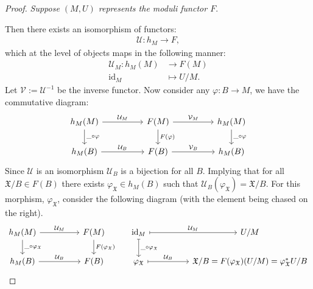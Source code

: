 \begin{proof}
    \textit{Suppose $(M,U)$ represents the moduli functor $F$}.
    \par Then there exists an isomorphism of functors:
    \begin{align*}
        \mathcal{U}:h_{M} \to F,
    \end{align*}
    which at the level of objects maps in the following manner:
    \begin{align*}
        \mathcal{U}_{M}:h_{M}(M) &\to F(M)\\
        \text{id}_{M} &\mapsto U/M.
    \end{align*}
    Let $\mathcal{V}:= \mathcal{U}^{-1}$ be the inverse functor. Now consider any $\varphi: B \to M$, we have the commutative diagram:
    \[
        \begin{tikzcd}
            h_{M}(M) & & F(M) & & h_{M}(M)\\
            h_{M}(B) & & F(B) & & h_{M}(B)
            \arrow["\mathcal{U}_{M}", from = 1-1, to = 1-3]
            \arrow["\mathcal{V}_{M}", from = 1-3, to = 1-5]
            \arrow["\mathcal{U}_{B}", from = 2-1, to = 2-3]
            \arrow["\mathcal{V}_B", from = 2-3, to = 2-5]
            \arrow["F(\varphi)", from = 1-3, to = 2-3]
            \arrow["\_\circ \varphi", from = 1-1, to = 2-1]
            \arrow["\_\circ \varphi", from = 1-5, to = 2-5]
        \end{tikzcd}
    \]
    Since $\mathcal{U}$ is an isomorphism $\mathcal{U}_{B}$ is a bijection for all $B$. Implying that for all $\mathfrak{X}/B \in F(B)$ there exists $\varphi_{\mathfrak{X}}\in h_{M}(B)$ such that $\mathcal{U}_{B}(\varphi_{\mathfrak{X}}) = \mathfrak{X}/B$. 
    For this morphism, $\varphi_{\mathfrak{X}}$, consider the following diagram (with the element being chased on the right).
    \[
        \begin{tikzcd}
            h_{M}(M) & & F(M)  & \text{id}_{M} && U/M\\
            h_{M}(B) & & F(B)  & \varphi_{\mathfrak{X}} && \mathfrak{X}/B = F(\varphi_{\mathfrak{X}})(U/M) = \varphi_{\mathfrak{X}}^{*}U/B
            \arrow["\mathcal{U}_{M}", from = 1-1, to = 1-3]
            \arrow["\mathcal{U}_{B}", from = 2-1, to = 2-3]
            \arrow["F(\varphi_{\mathfrak{X}})", from = 1-3, to = 2-3]
            \arrow["\_\circ \varphi_{\mathfrak{X}}", from = 1-1, to = 2-1]
            \arrow["\mathcal{U}_{M}", mapsto, from = 1-4, to = 1-6]
            \arrow["\mathcal{U}_{B}", mapsto, from = 2-4, to = 2-6]
            \arrow["\_\circ \varphi_{\mathfrak{X}}", mapsto, from = 1-4, to = 2-4]

\end{tikzcd}\]
\end{proof}
